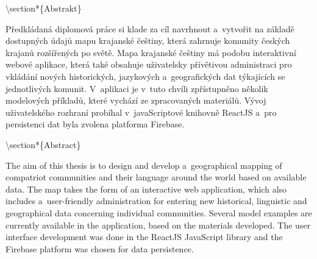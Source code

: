 \textbackslash section*\{Abstrakt\}

Předkládaná diplomová práce si klade za cíl navrhnout a~vytvořit na základě dostupných údajů mapu krajanské češtiny, která zahrnuje komunity českých krajanů rozšířených po světě. Mapa krajanské češtiny má podobu interaktivní webové aplikace, která také obsahuje uživatelsky přívětivou administraci pro vkládání nových historických, jazykových a~geografických dat týkajících se jednotlivých komunit. V~aplikaci je v~tuto chvíli zpřístupněno několik modelových příkladů, které vychází ze zpracovaných materiálů. Vývoj uživatelského rozhraní probíhal v~javaScriptové knihovně ReactJS a~pro persistenci dat byla zvolena platforma Firebase.

\textbackslash section*\{Abstract\}

The aim of this thesis is to design and develop a~geographical mapping of compatriot communities and their language around the world based on available data. The map takes the form of an interactive web application, which also includes a~user-friendly administration for entering new historical, linguistic and geographical data concerning individual communities. Several model examples are currently available in the application, based on the materials developed. The user interface development was done in the ReactJS JavaScript library and the Firebase platform was chosen for data persistence.
